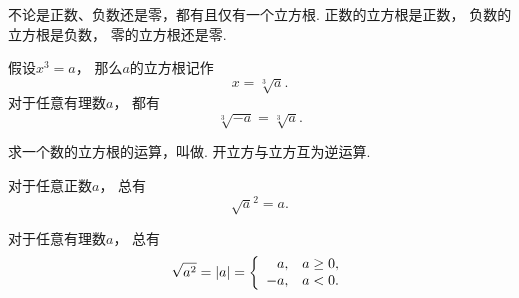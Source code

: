 不论是正数、负数还是零，都有且仅有一个立方根.
正数的立方根是正数，
负数的立方根是负数，
零的立方根还是零.

假设\(x^3 = a\)，
那么\(a\)的立方根记作\[
	x = \sqrt[3]{a}.
\]
对于任意有理数\(a\)，
都有\[
	\sqrt[3]{-a} = \sqrt[3]{a}.
\]

求一个数的立方根的运算，叫做.
开立方与立方互为逆运算.

对于任意正数\(a\)，
总有\[
	\sqrt{a}^2
	= a.
\]

对于任意有理数\(a\)，
总有\[
	\sqrt{a^2}
	= \abs{a}
	= \left\{ \begin{array}{rl}
		a, & a\geq0, \\
		-a, & a<0.
	\end{array} \right.
\]
